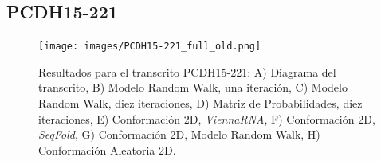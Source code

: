 \documentclass[a4paper,11pt,titlepage]{article}
\theoremstyle{definition}
\begin{document}
\subsection*{PCDH15-221}\label{subsec:gene2}

\begin{figure}[H]
    \centering
    \texttt{[image: images/PCDH15-221\_full\_old.png]}
    \small{\caption{Resultados para el transcrito PCDH15-221: A) Diagrama del transcrito, B) Modelo Random Walk, una iteración, C) Modelo Random Walk, diez iteraciones, D) Matriz de Probabilidades, diez iteraciones, E) Conformación 2D, \textit{ViennaRNA}, F) Conformación 2D, \textit{SeqFold}, G) Conformación 2D, Modelo Random Walk, H) Conformación Aleatoria 2D.}\label{fig:PCDH15-221-diag}}\normalsize
\end{figure}
\end{document}
